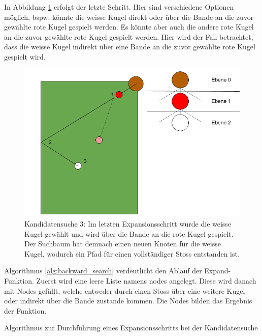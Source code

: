 In Abbildung \ref{fig:backwardsearch_3} erfolgt der letzte Schritt. Hier sind verschiedene Optionen möglich, bspw.
könnte die weisse Kugel direkt oder über die Bande an die zuvor gewählte rote Kugel gespielt werden. Es könnte aber auch
die andere rote Kugel an die zuvor gewählte rote Kugel gespielt werden. Hier wird der Fall betrachtet, dass die weisse Kugel
indirekt über eine Bande an die zuvor gewählte rote Kugel gespielt wird.
\begin{figure}[h!]
    \begin{center}
        \includegraphics[width=0.5\linewidth]{../common/03_billiard_ai/resources/13_backwardsearch_3.png}
    \end{center}
    \caption{Kandidatensuche 3: Im letzten Expansionsschritt wurde die weisse Kugel gewählt und wird über die Bande an die rote Kugel gespielt.
    Der Suchbaum hat demnach einen neuen Knoten für die weisse Kugel, wodurch ein Pfad für einen vollständiger Stoss entstanden ist.}
    \label{fig:backwardsearch_3}
\end{figure}

\newpage
Algorithmus \ref{alg:backward_search} verdeutlicht den Ablauf der \glqq Expand-Funktion\grqq. Zuerst wird eine
leere Liste namens \glqq nodes\grqq{} angelegt. Diese wird danach mit Nodes gefüllt, welche entweder durch einen Stoss
über eine weitere Kugel oder indirekt über die Bande zustande kommen. Die Nodes bilden das Ergebnis der Funktion.

\begin{algorithm}[H]
    \DontPrintSemicolon
    \caption{Algorithmus zur Durchführung eines Expansionsschritts bei der Kandidatensuche}
    \label{alg:backward_search}
\end{algorithm}

